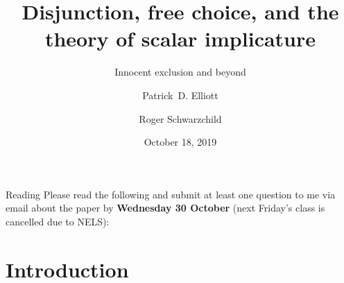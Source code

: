 \documentclass[landscape,cronos,paper=letter]{ling-handout}
\title{Disjunction, free choice, and the theory of scalar implicature}
\subtitle{Innocent exclusion and beyond}
\date{October 18, 2019}
\author{Patrick~D. Elliott
  \and
Roger Schwarzchild}
\begin{document}
\maketitle

    \begin{tcolorbox}
      Reading
      \tcblower
Please read the following and submit at least one question to me via email about the paper by \textbf{Wednesday 30 October} (next Friday's class is cancelled due to NELS):
\vspace{1ex}

  \end{tcolorbox}

\section{Introduction}
\end{document}
